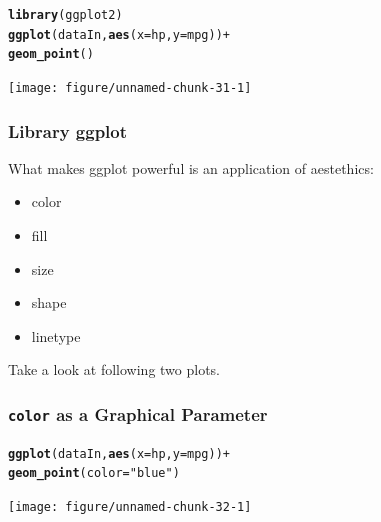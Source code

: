 \documentclass[12pt]{beamer}\usepackage[]{graphicx}\usepackage[]{color}
\makeatletter
\newcommand{\hlstr}[1]{\textcolor[rgb]{0.192,0.494,0.8}{#1}}%
\newcommand{\hlopt}[1]{\textcolor[rgb]{0,0,0}{#1}}%
\newcommand{\hlstd}[1]{\textcolor[rgb]{0.345,0.345,0.345}{#1}}%
\newcommand{\hlkwc}[1]{\textcolor[rgb]{0.333,0.667,0.333}{#1}}%
\newcommand{\hlkwd}[1]{\textcolor[rgb]{0.737,0.353,0.396}{\textbf{#1}}}%
\newenvironment{kframe}{%
 \def\at@end@of@kframe{}%
 \ifinner\ifhmode%
  \def\at@end@of@kframe{\end{minipage}}%
  \begin{minipage}{\columnwidth}%
 \fi\fi%
 \def\FrameCommand##1{\hskip\@totalleftmargin \hskip-\fboxsep
 \colorbox{shadecolor}{##1}\hskip-\fboxsep
     \hskip-\linewidth \hskip-\@totalleftmargin \hskip\columnwidth}%
 \MakeFramed {\advance\hsize-\width
   \@totalleftmargin\z@ \linewidth\hsize
   \@setminipage}}%
 {\par\unskip\endMakeFramed%
 \at@end@of@kframe}
\newenvironment{knitrout}{}{} %
\makeatother
\begin{document}

\begin{frame}[fragile]\centering

\begin{knitrout}\footnotesize
{}\color{fgcolor}\begin{kframe}
\begin{alltt}
\hlkwd{library}\hlstd{(ggplot2)}
\hlkwd{ggplot}\hlstd{(dataIn,} \hlkwd{aes}\hlstd{(}\hlkwc{x}\hlstd{=hp,} \hlkwc{y}\hlstd{=mpg))} \hlopt{+}
  \hlkwd{geom_point}\hlstd{()}
\end{alltt}
\end{kframe}
\texttt{[image: figure/unnamed-chunk-31-1]} 

\end{knitrout}

\end{frame}


\begin{frame}[fragile]\large
\frametitle{Library ggplot}

What makes ggplot powerful is an application of aestethics:
\begin{itemize}
 \item color
 \item fill
 \item size
 \item shape
 \item linetype
\end{itemize}\bigskip

Take a look at following two plots.

\end{frame}


\begin{frame}[fragile]\centering
\frametitle{\texttt{color} as a Graphical Parameter}
\begin{knitrout}\footnotesize
{}\color{fgcolor}\begin{kframe}
\begin{alltt}
\hlkwd{ggplot}\hlstd{(dataIn,} \hlkwd{aes}\hlstd{(}\hlkwc{x}\hlstd{=hp,} \hlkwc{y}\hlstd{=mpg))} \hlopt{+}
  \hlkwd{geom_point}\hlstd{(}\hlkwc{color}\hlstd{=}\hlstr{"blue"}\hlstd{)}
\end{alltt}
\end{kframe}
\texttt{[image: figure/unnamed-chunk-32-1]} 

\end{knitrout}

\end{frame}
\end{document}
